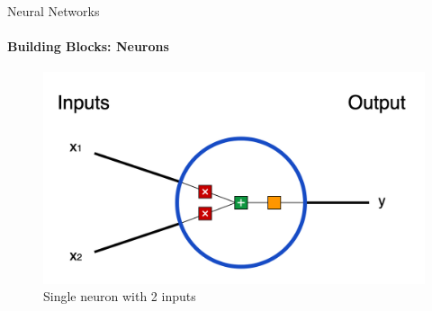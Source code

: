 \documentclass[11pt]{beamer}
\begin{document}
\begin{frame}{Neural Networks}
\framesubtitle{Building Blocks: Neurons}

	\begin{figure}
	\centering
	\includegraphics[scale=0.49]{twoinputneurons}
	\caption{Single neuron with 2 inputs}
\end{figure}		
\end{frame}
%
\end{document}
